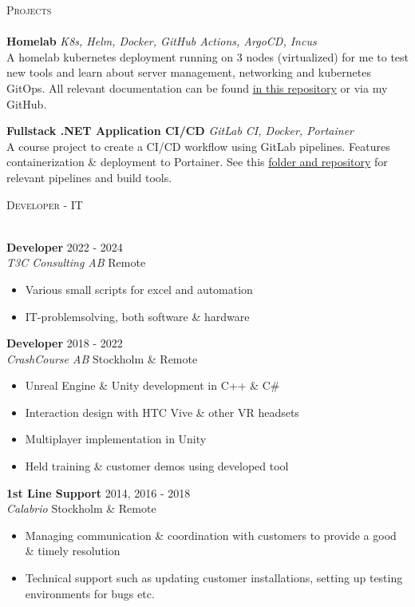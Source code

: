\documentclass[a4paper]{article}
\newcommand{\lineunder} {
    \vspace*{-8pt} \\
    \hspace*{-18pt} \hrulefill \\
}
\newcommand{\header} [1] {
    {\hspace*{-18pt}\vspace*{6pt} \textsc{#1}}
    \vspace*{-6pt} \lineunder
}
\begin{document}
\header{Projects}
{\textbf{Homelab}} {\sl K8s, Helm, Docker, GitHub Actions, ArgoCD, Incus} \\
A homelab kubernetes deployment running on 3 nodes (virtualized) for me to test new tools and learn about server management, networking and kubernetes GitOps. All relevant documentation can be found \href{https://github.com/pontusc/homelab}{in this repository} or via my GitHub.\\
\vspace{4mm}

{\textbf{Fullstack .NET Application CI/CD}} {\sl GitLab CI, Docker, Portainer} \\
A course project to create a CI/CD workflow using GitLab pipelines. Features containerization \& deployment to Portainer. See this \href{https://github.com/pontusc/devops-doe24/tree/main/pipeline-utilities}{folder and repository} for relevant pipelines and build tools.\\
\vspace{8mm}

\header{Developer - IT}
\vspace{4mm}

\textbf{Developer} \hfill 2022 - 2024\\
\textit{T3C Consulting AB} \hfill Remote\\
\vspace{-1mm}
\begin{itemize} \itemsep 1pt
  \item Various small scripts for excel and automation
  \item IT-problemsolving, both software \& hardware
\end{itemize}
\vspace{1mm}
\textbf{Developer} \hfill 2018 - 2022\\
\textit{CrashCourse AB} \hfill Stockholm \& Remote\\
\vspace{-1mm}
\begin{itemize} \itemsep 1pt
  \item Unreal Engine \& Unity development in C++ \& C\#
  \item Interaction design with HTC Vive \& other VR headsets
  \item Multiplayer implementation in Unity
  \item Held training \& customer demos using developed tool
\end{itemize}
\vspace{1mm}
\textbf{1st Line Support} \hfill 2014, 2016 - 2018\\
\textit{Calabrio} \hfill Stockholm \& Remote\\
\vspace{-1mm}
\begin{itemize} \itemsep 1pt
  \item Managing communication \& coordination with customers to provide a good \& timely resolution
  \item Technical support such as updating customer installations, setting up testing environments for bugs etc.
\end{itemize}
\vspace{8mm}
\ 
\end{document}
